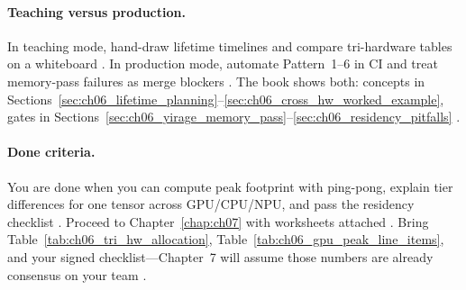 \paragraph{Teaching versus production.}
In teaching mode, hand-draw lifetime timelines and compare tri-hardware tables on a whiteboard \citep{dlbook,wu2024mirage}.
In production mode, automate Pattern~1--6 in CI and treat memory-pass failures as merge blockers \citep{yirage2026,patel2025llminference,mpk2025}.
The book shows both: concepts in Sections~\ref{sec:ch06_lifetime_planning}--\ref{sec:ch06_cross_hw_worked_example}, gates in Sections~\ref{sec:ch06_yirage_memory_pass}--\ref{sec:ch06_residency_pitfalls} \citep{chen2020compilerbasedhardw,memoryfloor2026}.

\paragraph{Done criteria.}
You are done when you can compute peak footprint with ping-pong, explain tier differences for one tensor across GPU/CPU/NPU, and pass the residency checklist \citep{yirage2026,patel2025llminference,amd2024aie,nvidia2022hopper}.
Proceed to Chapter~\ref{chap:ch07} with worksheets attached \citep{chen2020compilerbasedhardw}.
Bring Table~\ref{tab:ch06_tri_hw_allocation}, Table~\ref{tab:ch06_gpu_peak_line_items}, and your signed checklist---Chapter~7 will assume those numbers are already consensus on your team \citep{yirage2026,patel2025llminference,taxbreak2026}.

